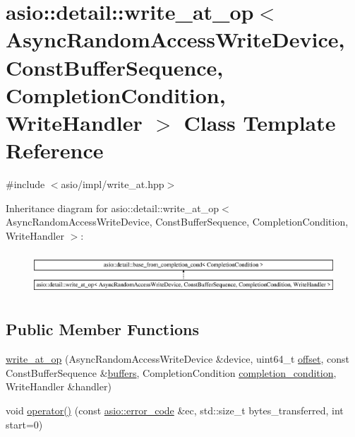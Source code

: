 \hypertarget{classasio_1_1detail_1_1write__at__op}{}\section{asio\+:\+:detail\+:\+:write\+\_\+at\+\_\+op$<$ Async\+Random\+Access\+Write\+Device, Const\+Buffer\+Sequence, Completion\+Condition, Write\+Handler $>$ Class Template Reference}
\label{classasio_1_1detail_1_1write__at__op}


{\ttfamily \#include $<$asio/impl/write\+\_\+at.\+hpp$>$}

Inheritance diagram for asio\+:\+:detail\+:\+:write\+\_\+at\+\_\+op$<$ Async\+Random\+Access\+Write\+Device, Const\+Buffer\+Sequence, Completion\+Condition, Write\+Handler $>$\+:\begin{figure}[H]
\begin{center}
\leavevmode
\includegraphics[height=1.588652cm]{classasio_1_1detail_1_1write__at__op}
\end{center}
\end{figure}
\subsection*{Public Member Functions}
\begin{DoxyCompactItemize}
\item 
\hyperlink{classasio_1_1detail_1_1write__at__op_a908ed53ed0853e51e05863cf2325a3e3}{write\+\_\+at\+\_\+op} (Async\+Random\+Access\+Write\+Device \&device, uint64\+\_\+t \hyperlink{group__async__read__at_ga8dcdb41a4adfd6fe5322b5dd666d9f29}{offset}, const Const\+Buffer\+Sequence \&\hyperlink{group__async__read_ga54dede45c3175148a77fe6635222c47d}{buffers}, Completion\+Condition \hyperlink{group__async__read_gae2e215d5013596cc2b385bb6c13fa518}{completion\+\_\+condition}, Write\+Handler \&handler)
\item 
void \hyperlink{classasio_1_1detail_1_1write__at__op_a7df9d03280c0bf386c003c99d539534f}{operator()} (const \hyperlink{classasio_1_1error__code}{asio\+::error\+\_\+code} \&ec, std\+::size\+\_\+t bytes\+\_\+transferred, int start=0)
\end{DoxyCompactItemize}
